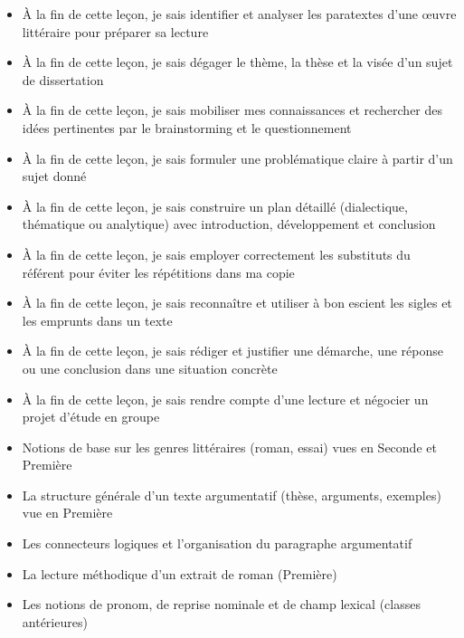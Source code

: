 \documentclass[11pt]{article}
\begin{document}
\begin{objectifs}
\begin{itemize}
\item À la fin de cette leçon, je sais identifier et analyser les paratextes d'une œuvre littéraire pour préparer sa lecture
\item À la fin de cette leçon, je sais dégager le thème, la thèse et la visée d'un sujet de dissertation
\item À la fin de cette leçon, je sais mobiliser mes connaissances et rechercher des idées pertinentes par le brainstorming et le questionnement
\item À la fin de cette leçon, je sais formuler une problématique claire à partir d'un sujet donné
\item À la fin de cette leçon, je sais construire un plan détaillé (dialectique, thématique ou analytique) avec introduction, développement et conclusion
\item À la fin de cette leçon, je sais employer correctement les substituts du référent pour éviter les répétitions dans ma copie
\item À la fin de cette leçon, je sais reconnaître et utiliser à bon escient les sigles et les emprunts dans un texte
\item À la fin de cette leçon, je sais rédiger et justifier une démarche, une réponse ou une conclusion dans une situation concrète
\item À la fin de cette leçon, je sais rendre compte d'une lecture et négocier un projet d'étude en groupe
\end{itemize}
\end{objectifs}

\begin{prerequis}
\begin{itemize}
\item Notions de base sur les genres littéraires (roman, essai) vues en Seconde et Première
\item La structure générale d'un texte argumentatif (thèse, arguments, exemples) vue en Première
\item Les connecteurs logiques et l'organisation du paragraphe argumentatif
\item La lecture méthodique d'un extrait de roman (Première)
\item Les notions de pronom, de reprise nominale et de champ lexical (classes antérieures)
\end{itemize}
\end{prerequis}
\end{document}
